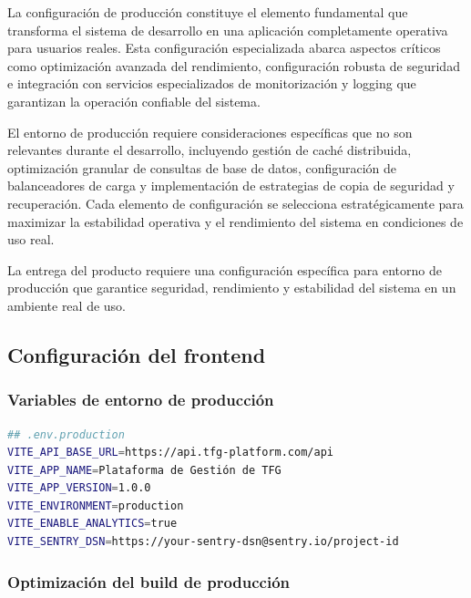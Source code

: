 \documentclass[12pt,a4paper,oneside]{report}
\begin{document}
La configuración de producción constituye el elemento fundamental que transforma el sistema de desarrollo en una aplicación completamente operativa para usuarios reales. Esta configuración especializada abarca aspectos críticos como optimización avanzada del rendimiento, configuración robusta de seguridad e integración con servicios especializados de monitorización y logging que garantizan la operación confiable del sistema.

El entorno de producción requiere consideraciones específicas que no son relevantes durante el desarrollo, incluyendo gestión de caché distribuida, optimización granular de consultas de base de datos, configuración de balanceadores de carga y implementación de estrategias de copia de seguridad y recuperación. Cada elemento de configuración se selecciona estratégicamente para maximizar la estabilidad operativa y el rendimiento del sistema en condiciones de uso real.

La entrega del producto requiere una configuración específica para
entorno de producción que garantice seguridad, rendimiento y estabilidad
del sistema en un ambiente real de uso.

\subsection{Configuración del
frontend}\label{configuraciuxf3n-del-frontend}

\subsubsection{Variables de entorno de
producción}\label{variables-de-entorno-de-producciuxf3n}

\begin{lstlisting}[language=bash]
## .env.production
VITE_API_BASE_URL=https://api.tfg-platform.com/api
VITE_APP_NAME=Plataforma de Gestión de TFG
VITE_APP_VERSION=1.0.0
VITE_ENVIRONMENT=production
VITE_ENABLE_ANALYTICS=true
VITE_SENTRY_DSN=https://your-sentry-dsn@sentry.io/project-id
\end{lstlisting}

\subsubsection{Optimización del build de
producción}\label{optimizaciuxf3n-del-build-de-producciuxf3n}
\end{document}
